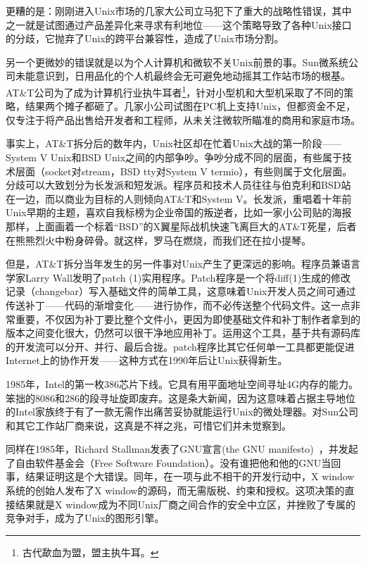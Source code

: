 \documentclass[12pt,oneside]{ctexbook}
\begin{document}
\begin{common-format}
更糟的是：刚刚进入Unix市场的几家大公司立马犯下了重大的战略性错误，其中之一就是试图通过产品差异化来寻求有利地位——这个策略导致了各种Unix接口的分歧，它抛弃了Unix的跨平台兼容性，造成了Unix市场分割。

另一个更微妙的错误就是以为个人计算机和微软不关Unix前景的事。Sun微系统公司未能意识到，日用品化的个人机最终会无可避免地动摇其工作站市场的根基。AT\&{}T公司为了成为计算机行业执牛耳者\footnote{古代歃血为盟，盟主执牛耳。}，针对小型机和大型机采取了不同的策略，结果两个摊子都砸了。几家小公司试图在PC机上支持Unix，但都资金不足，仅专注于将产品出售给开发者和工程师，从未关注微软所瞄准的商用和家庭市场。

事实上，AT\&{}T拆分后的数年内，Unix社区却在忙着Unix大战的第一阶段——System V Unix和BSD Unix之间的内部争吵。争吵分成不同的层面，有些属于技术层面（socket对stream，BSD tty对System V termio），有些则属于文化层面。分歧可以大致划分为长发派和短发派。程序员和技术人员往往与伯克利和BSD站在一边，而以商业为目标的人则倾向AT\&{}T和System V。长发派，重唱着十年前Unix早期的主题，喜欢自我标榜为企业帝国的叛逆者，比如一家小公司贴的海报那样，上面画着一个标着“BSD”的X翼星际战机快速飞离巨大的AT\&{}T死星，后者在熊熊烈火中粉身碎骨。就这样，罗马在燃烧，而我们还在拉小提琴。

但是，AT\&{}T拆分当年发生的另一件事对Unix产生了更深远的影响。程序员兼语言学家Larry Wall发明了patch (1)实用程序。Patch程序是一个将diff(1)生成的修改记录（changebar）写入基础文件的简单工具，这意味着Unix开发人员之间可通过传送补丁——代码的渐增变化——进行协作，而不必传送整个代码文件。这一点非常重要，不仅因为补丁要比整个文件小，更因为即使基础文件和补丁制作者拿到的版本之间变化很大，仍然可以很干净地应用补丁。运用这个工具，基于共有源码库的开发流可以分开、并行、最后合拢。patch程序比其它任何单一工具都更能促进Internet上的协作开发——这种方式在1990年后让Unix获得新生。

1985年，Intel的第一枚386芯片下线。它具有用平面地址空间寻址4G内存的能力。笨拙的8086和286的段寻址旋即废弃。这是条大新闻，因为这意味着占据主导地位的Intel家族终于有了一款无需作出痛苦妥协就能运行Unix的微处理器。对Sun公司和其它工作站厂商来说，这真是不祥之兆，可惜它们并未觉察到。

同样在1985年，Richard Stallman发表了GNU宣言(the GNU manifesto)~\cite{Stallman}，并发起了自由软件基金会（Free Software Foundation）。没有谁把他和他的GNU当回事，结果证明这是个大错误。同年，在一项与此不相干的开发行动中，X window系统的创始人发布了X window的源码，而无需版税、约束和授权。这项决策的直接结果就是X window成为不同Unix厂商之间合作的安全中立区，并挫败了专属的竞争对手，成为了Unix的图形引擎。


\end{common-format}
\end{document}
